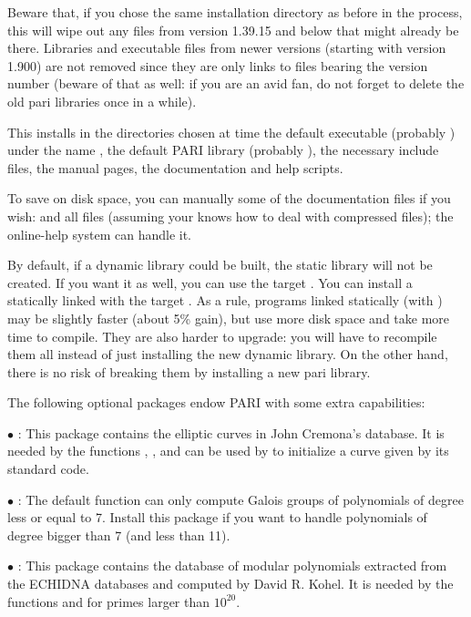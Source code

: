 Beware that, if you chose the same installation directory as before in the
 process, this will wipe out any files from version 1.39.15
and below that might already be there. Libraries and executable files from
newer versions (starting with version 1.900) are not removed since they are
only links to files bearing the version number (beware of that as well: if
you are an avid  fan, do not forget to delete the old pari libraries
once in a while).

This installs in the directories chosen at  time the default
 executable (probably ) under the name , the
default PARI library (probably ), the necessary include
files, the manual pages, the documentation and help scripts.

To save on disk space, you can manually  some of the documentation
files if you wish:  and all  files (assuming your
 knows how to deal with compressed files); the online-help system
can handle it.

By default, if a dynamic library  could be built, the static
library  will not be created. If you want it as well, you can
use the target . You can install a statically
linked  with the target . As a rule,
programs linked statically (with ) may be slightly faster
(about 5\% gain), but use more disk space and take more time to compile.
They are also harder to upgrade: you will have to recompile them all instead
of just installing the new dynamic library. On the other hand, there is no
risk of breaking them by installing a new pari library.

 The following optional packages endow PARI with some
extra capabilities:

$\bullet$ : This package contains the elliptic curves in
John Cremona's database. It is needed by the functions ,
,  and can be used by  to initialize a curve given by its standard code.

$\bullet$ : The default  function can only
compute Galois groups of polynomials of degree less or equal to 7. Install
this package if you want to handle polynomials of degree bigger than 7 (and
less than 11).

$\bullet$ : This package contains the database of modular
polynomials extracted from the ECHIDNA databases and computed by David R.
Kohel. It is needed by the functions  and  for
primes larger than $10^{20}$.


